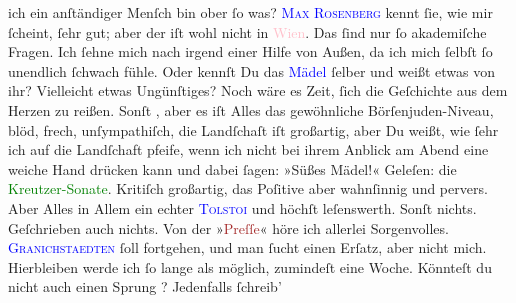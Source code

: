                ich ein anſtändiger Menſch bin ober ſo was? \textsc{\textcolor{blue}{Max Rosenberg}{}\ledrightnote{\textcolor{blue}{Max von Rosenberg}}} kennt ſie, wie mir ſcheint, ſehr gut; aber der iſt wohl nicht in \textcolor{pink}{Wien}{}\ledrightnote{\textcolor{pink}{Wien}}. Das ſind nur ſo akademiſche Fragen. Ich ſehne
               mich nach irgend einer Hilfe von Außen, da ich mich ſelbſt ſo unendlich ſchwach
               fühle. Oder kennſt Du das {\pb}\textcolor{blue}{Mädel}{} ſelber und weißt etwas
               von ihr? Vielleicht etwas Ungünſtiges? Noch wäre es Zeit, ſich die Geſchichte aus dem
               Herzen zu reißen.\pend
           \pstart
           Sonſt \label{K_L02649-4v}\label{K_L02649-4h}, aber es iſt Alles das gewöhnliche Börſenjuden-Niveau, blöd, frech,
               unſympathiſch, die Landſchaſt iſt großartig, aber Du weißt, wie ſehr ich auf die
               Landſchaft pfeife, wenn ich nicht bei ihrem Anblick am Abend eine weiche Hand drücken
               kann und dabei ſagen: »Süßes Mädel!«\pend
           \pstart
           Geleſen: die 
                  \textcolor{green}{Kreutzer-Sonate}{}\ledrightnote{\textcolor{green}{Die Kreutzersonate}}. Kritiſch großartig\strikeout{\textcolor{gray}{e}}, das Poſitive aber wahnſinnig und pervers. Aber Alles in Allem ein echter \textsc{\textcolor{blue}{Tolstoi}{}\ledrightnote{\textcolor{blue}{Leo N. von Tolstoi}}} und höchſt leſenswerth. Sonſt nichts. Geſchrieben auch nichts. Von der »\textcolor{brown}{Preſſe}{}\ledrightnote{\textcolor{brown}{Die Presse}}« höre ich allerlei Sorgenvolles. \textsc{\textcolor{blue}{Granichstaedten}{}\ledrightnote{\textcolor{blue}{Emil Granichstaedten}}} ſoll fortgehen, und man ſucht einen Erſatz, aber nicht mich. Hierbleiben werde
               ich ſo lange als möglich, zumindeſt eine Woche. Könnteſt du nicht auch einen Sprung
                  \label{K_L02649-8v}\label{K_L02649-8h}? Jedenfalls  ſchreib’
